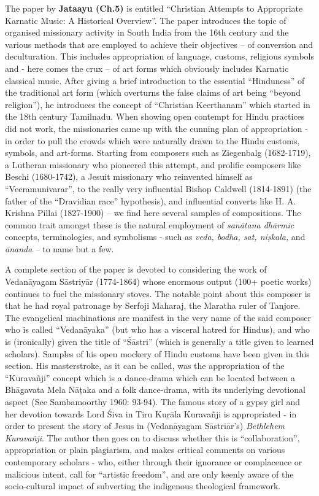 The paper by \textbf{Jataayu (Ch.5)} is entitled “Christian Attempts to Appropriate Karnatic Music: A Historical Overview”. The paper introduces the topic of organised missionary activity in South India from the 16th century and the various methods that are employed to achieve their objectives – of conversion and deculturation. This includes appropriation of language, customs, religious symbols and - here comes the crux – of art forms which obviously includes Karnatic classical music. After giving a brief introduction to the essential “Hinduness” of the traditional art form (which overturns the false claims of art being “beyond religion”), he introduces the concept of “Christian Keerthanam” which started in the 18th century Tamilnadu. When showing open contempt for Hindu practices did not work, the missionaries came up with the cunning plan of appropriation - in order to pull the crowds which were naturally drawn to the Hindu customs, symbols, and art-forms. Starting from composers such as Ziegenbalg (1682-1719), a Lutheran missionary who pioneered this attempt, and prolific composers like Beschi (1680-1742), a Jesuit missionary who reinvented himself as “Veeramunivarar”, to the really very influential Bishop Caldwell (1814-1891) (the father of the “Dravidian race” hypothesis), and influential converts like H. A. Krishna Pillai (1827-1900) – we find here several samples of compositions. The common trait amongst these is the natural employment of \textit{sanātana dhārmic} concepts, terminologies, and symbolisms - such as \textit{veda, bodha, sat, niṣkala,} and \textit{ānanda –} to name but a few.

A complete section of the paper is devoted to considering the work of Vedanāyagam Sāstriyār (1774-1864) whose enormous output (100+ poetic works) continues to fuel the missionary stoves. The notable point about this composer is that he had royal patronage by Serfoji Maharaj, the Maratha ruler of Tanjore. The evangelical machinations are manifest in the very name of the said composer who is called “Vedanāyaka” (but who has a visceral hatred for Hindus), and who is (ironically) given the title of “Śāstri” (which is generally a title given to learned scholars). Samples of his open mockery of Hindu customs have been given in this section. His masterstroke, as it can be called, was the appropriation of the “Kuravañji” concept which is a dance-drama which can be located between a Bhāgavata Mela Nāṭaka and a folk dance-drama, with its underlying devotional aspect (See Sambamoorthy 1960: 93-94). The famous story of a gypsy girl and her devotion towards Lord Śiva in Tiru Kuṟāla Kuravañji is appropriated - in order to present the story of Jesus in (Vedanāyagam Sāstriār’s) \textit{Bethlehem Kuravañji}. The author then goes on to discuss whether this is “collaboration”, appropriation or plain plagiarism, and makes critical comments on various contemporary scholars - who, either through their ignorance or complacence or malicious intent, call for “artistic freedom”, and are only keenly aware of the socio-cultural impact of subverting the indigenous theological framework.

